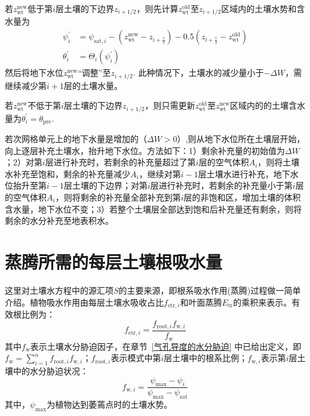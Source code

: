 若$z_{\mathrm{wt}}^{\mathrm{new}}$低于第$i$层土壤的下边界$z_{i+1/2}$，则先计算$z_{\mathrm{wt}}^{\mathrm{old}}$至$z_{i+1/2}$区域内的土壤水势和含水量为
\begin{equation} \label{formula:adjust_zwt1}
  \begin{aligned}
    \psi_i^{\prime} & = \psi_{\mathrm{sat},i} - \left(z_{\mathrm{wt}}^{\mathrm{new}} - z_{i+\frac{1}{2}}\right) -0.5\left( z_{i+\frac{1}{2}} - z_{\mathrm{wt}}^{\mathrm{old}}\right) \\
    \theta_i^{\prime} & = \Theta_i\left(\psi_i^{\prime}\right)
  \end{aligned}
\end{equation}
然后将地下水位$z_{\mathrm{wt}}^{\mathrm{new}}$“调整”至$z_{i+1/2}$. 此种情况下，土壤水的减少量小于$- \Delta W$，需继续减少第$i+1$层的土壤水量。

若$z_{\mathrm{wt}}^{\mathrm{new}}$不低于第$i$层土壤的下边界$z_{i+1/2}$，则只需更新$z_{\mathrm{wt}}^{\mathrm{old}}$至$z_{\mathrm{wt}}^{\mathrm{new}}$区域内的的土壤含水量为$\theta_i^{\prime} = \theta_{\mathrm{pre}}$.


若次网格单元上的地下水量是增加的（$\Delta W > 0$）,则从地下水位所在土壤层开始，向上逐层补充土壤水，抬升地下水位。方法如下：1）剩余补充量的初始值为$\Delta W$；2）对第$i$层进行补充时，若剩余的补充量超过了第$i$层的空气体积$A_i$，则将土壤水补充至饱和，剩余的补充量减少$A_i$，继续对第$i-1$层土壤水进行补充，地下水位抬升至第$i-1$层土壤的下边界；对第$i$层进行补充时，若剩余的补充量小于第$i$层的空气体积$A_i$，则将剩余的补充量全部补充到第$i$层的非饱和区，增加土壤的体积含水量，地下水位不变；3）若整个土壤层全部达到饱和后补充量还有剩余，则将剩余的水分补充至地表积水。



\section{蒸腾所需的每层土壤根吸水量}

这里对土壤水方程中的源汇项$S$的主要来源，即根系吸水作用(蒸腾)过程做一简单介绍。植物吸水作用由每层土壤水吸收占比$f_{\mathrm{etr},i}$和叶面蒸腾$E_{\mathrm{tr}}$的乘积来表示\citep{dai2003common}。有效根比例为：
\begin{equation}
  {f}_{\mathrm{ {etr }}, {i}}=\frac{{f}_{\mathrm{{root}}, {i}} {f}_{\mathrm{w},i}}{f_{\mathrm{w}}}
\end{equation}
其中$f_{\mathrm{w}}$表示土壤水分胁迫因子，在章节~\ref{气孔导度的水分胁迫} 中已给出定义，即$f_{\mathrm{w}} = \sum_{i=1}^{n}{f_{\mathrm{root},i}}f_{\mathrm{w},i}$；$f_{\mathrm{root},i}$表示模式中第$i$层土壤中的根系比例；$f_{\mathrm{w},i}$表示第$i$层土壤中的水分胁迫状况：
\begin{equation}
  {f}_{\mathrm{w},i}=\frac{\psi_{\max }-\psi_{i}}{\psi_{\max }-\psi_{\mathrm{sat}}}
\end{equation}
其中，$\psi_{\mathrm{max}}$为植物达到萎蔫点时的土壤水势。

